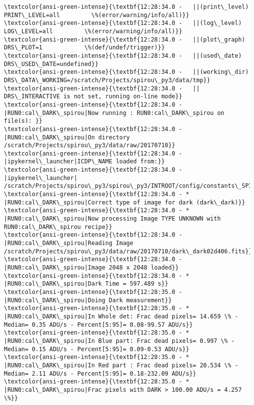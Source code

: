 \documentclass[11pt]{article}
\begin{document}
\begin{Verbatim}[commandchars=\\\{\}]
\textcolor{ansi-green-intense}{\textbf{12:28:34.0 -   ||(print\_level)       PRINT\_LEVEL=all         \%(error/warning/info/all)}}
\textcolor{ansi-green-intense}{\textbf{12:28:34.0 -   ||(log\_level)         LOG\_LEVEL=all         \%(error/warning/info/all)}}
\textcolor{ansi-green-intense}{\textbf{12:28:34.0 -   ||(plot\_graph)        DRS\_PLOT=1            \%(def/undef/trigger)}}
\textcolor{ansi-green-intense}{\textbf{12:28:34.0 -   ||(used\_date)         DRS\_USED\_DATE=undefined}}
\textcolor{ansi-green-intense}{\textbf{12:28:34.0 -   ||(working\_dir)       DRS\_DATA\_WORKING=/scratch/Projects/spirou\_py3/data/tmp}}
\textcolor{ansi-green-intense}{\textbf{12:28:34.0 -   ||                    DRS\_INTERACTIVE is not set, running on-line mode}}
\textcolor{ansi-green-intense}{\textbf{12:28:34.0 -   |RUN0:cal\_DARK\_spirou|Now running : RUN0:cal\_DARK\_spirou on file(s): }}
\textcolor{ansi-green-intense}{\textbf{12:28:34.0 -   |RUN0:cal\_DARK\_spirou|On directory /scratch/Projects/spirou\_py3/data/raw/20170710}}
\textcolor{ansi-green-intense}{\textbf{12:28:34.0 -   |ipykernel\_launcher|ICDP\_NAME loaded from:}}
\textcolor{ansi-green-intense}{\textbf{12:28:34.0 -   |ipykernel\_launcher|     /scratch/Projects/spirou\_py3/spirou\_py3/INTROOT/config/constants\_SPIROU\_H2RG.py}}
\textcolor{ansi-green-intense}{\textbf{12:28:34.0 - * |RUN0:cal\_DARK\_spirou|Correct type of image for dark (dark\_dark)}}
\textcolor{ansi-green-intense}{\textbf{12:28:34.0 - * |RUN0:cal\_DARK\_spirou|Now processing Image TYPE UNKNOWN with RUN0:cal\_DARK\_spirou recipe}}
\textcolor{ansi-green-intense}{\textbf{12:28:34.0 -   |RUN0:cal\_DARK\_spirou|Reading Image /scratch/Projects/spirou\_py3/data/raw/20170710/dark\_dark02d406.fits}}
\textcolor{ansi-green-intense}{\textbf{12:28:34.0 -   |RUN0:cal\_DARK\_spirou|Image 2048 x 2048 loaded}}
\textcolor{ansi-green-intense}{\textbf{12:28:34.0 - * |RUN0:cal\_DARK\_spirou|Dark Time = 597.489 s}}
\textcolor{ansi-green-intense}{\textbf{12:28:35.0 -   |RUN0:cal\_DARK\_spirou|Doing Dark measurement}}
\textcolor{ansi-green-intense}{\textbf{12:28:35.0 - * |RUN0:cal\_DARK\_spirou|In Whole det: Frac dead pixels= 14.659 \% - Median= 0.35 ADU/s - Percent[5:95]= 0.08-99.57 ADU/s}}
\textcolor{ansi-green-intense}{\textbf{12:28:35.0 - * |RUN0:cal\_DARK\_spirou|In Blue part: Frac dead pixels= 0.997 \% - Median= 0.15 ADU/s - Percent[5:95]= 0.09-0.53 ADU/s}}
\textcolor{ansi-green-intense}{\textbf{12:28:35.0 - * |RUN0:cal\_DARK\_spirou|In Red part : Frac dead pixels= 20.534 \% - Median= 2.11 ADU/s - Percent[5:95]= 0.18-232.09 ADU/s}}
\textcolor{ansi-green-intense}{\textbf{12:28:35.0 - * |RUN0:cal\_DARK\_spirou|Frac pixels with DARK > 100.00 ADU/s = 4.257 \%}}

\end{Verbatim}
\end{document}
